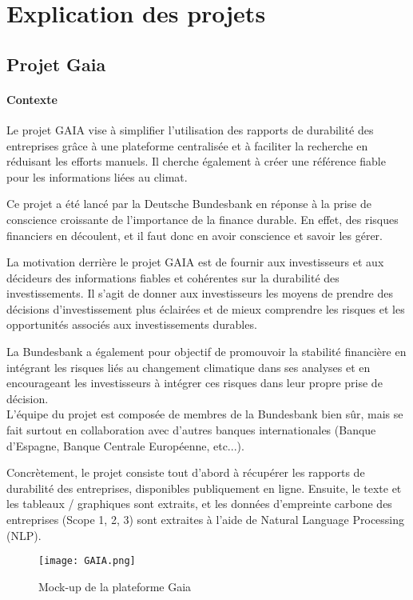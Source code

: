 \section{Explication des projets}

\subsection{Projet Gaia}

\paragraph{Contexte}

Le projet GAIA vise à simplifier l'utilisation des rapports de durabilité des entreprises grâce à une plateforme centralisée et à faciliter la recherche en réduisant les efforts manuels. 
Il cherche également à créer une référence fiable pour les informations liées au climat.

Ce projet a été lancé par la Deutsche Bundesbank en réponse à la prise de conscience croissante de l'importance de la finance durable.
En effet, des risques financiers en découlent, et il faut donc en avoir conscience et savoir les gérer.

La motivation derrière le projet GAIA est de fournir aux investisseurs et aux décideurs des informations fiables et cohérentes sur la durabilité des investissements. 
Il s'agit de donner aux investisseurs les moyens de prendre des décisions d'investissement plus éclairées et de mieux comprendre les risques et les opportunités associés aux investissements durables.

La Bundesbank a également pour objectif de promouvoir la stabilité financière en intégrant les risques liés au changement climatique dans ses analyses et en encourageant les investisseurs à intégrer ces risques dans leur propre prise de décision.
\\
L'équipe du projet est composée de membres de la Bundesbank bien sûr, mais se fait surtout en collaboration avec d'autres banques internationales (Banque d'Espagne, Banque Centrale Européenne, etc...).

Concrètement, le projet consiste tout d'abord à récupérer les rapports de durabilité des entreprises, disponibles publiquement en ligne.
Ensuite, le texte et les tableaux / graphiques sont extraits, et les données d'empreinte carbone des entreprises (Scope 1, 2, 3) sont extraites à l'aide de Natural Language Processing (NLP).

\begin{figure}[H]
    \centering
    \texttt{[image: GAIA.png]}
    \caption{Mock-up de la plateforme Gaia}
\end{figure}

